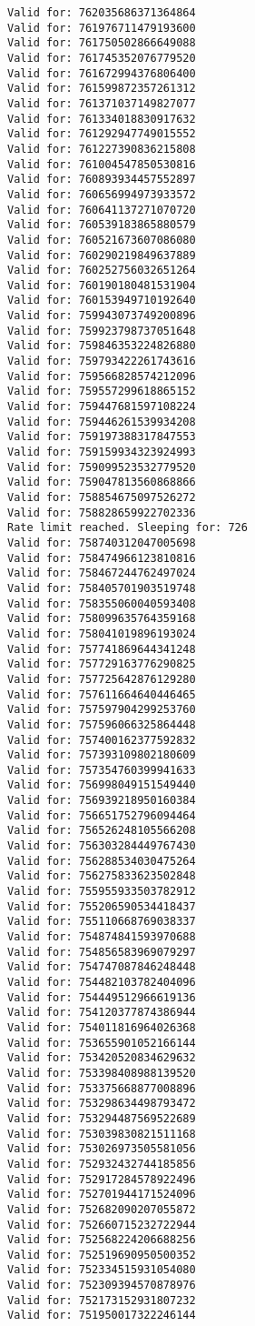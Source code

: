 \documentclass[11pt]{article}
\begin{document}
\begin{Verbatim}[commandchars=\\\{\}]
Valid for: 762035686371364864
Valid for: 761976711479193600
Valid for: 761750502866649088
Valid for: 761745352076779520
Valid for: 761672994376806400
Valid for: 761599872357261312
Valid for: 761371037149827077
Valid for: 761334018830917632
Valid for: 761292947749015552
Valid for: 761227390836215808
Valid for: 761004547850530816
Valid for: 760893934457552897
Valid for: 760656994973933572
Valid for: 760641137271070720
Valid for: 760539183865880579
Valid for: 760521673607086080
Valid for: 760290219849637889
Valid for: 760252756032651264
Valid for: 760190180481531904
Valid for: 760153949710192640
Valid for: 759943073749200896
Valid for: 759923798737051648
Valid for: 759846353224826880
Valid for: 759793422261743616
Valid for: 759566828574212096
Valid for: 759557299618865152
Valid for: 759447681597108224
Valid for: 759446261539934208
Valid for: 759197388317847553
Valid for: 759159934323924993
Valid for: 759099523532779520
Valid for: 759047813560868866
Valid for: 758854675097526272
Valid for: 758828659922702336
Rate limit reached. Sleeping for: 726
Valid for: 758740312047005698
Valid for: 758474966123810816
Valid for: 758467244762497024
Valid for: 758405701903519748
Valid for: 758355060040593408
Valid for: 758099635764359168
Valid for: 758041019896193024
Valid for: 757741869644341248
Valid for: 757729163776290825
Valid for: 757725642876129280
Valid for: 757611664640446465
Valid for: 757597904299253760
Valid for: 757596066325864448
Valid for: 757400162377592832
Valid for: 757393109802180609
Valid for: 757354760399941633
Valid for: 756998049151549440
Valid for: 756939218950160384
Valid for: 756651752796094464
Valid for: 756526248105566208
Valid for: 756303284449767430
Valid for: 756288534030475264
Valid for: 756275833623502848
Valid for: 755955933503782912
Valid for: 755206590534418437
Valid for: 755110668769038337
Valid for: 754874841593970688
Valid for: 754856583969079297
Valid for: 754747087846248448
Valid for: 754482103782404096
Valid for: 754449512966619136
Valid for: 754120377874386944
Valid for: 754011816964026368
Valid for: 753655901052166144
Valid for: 753420520834629632
Valid for: 753398408988139520
Valid for: 753375668877008896
Valid for: 753298634498793472
Valid for: 753294487569522689
Valid for: 753039830821511168
Valid for: 753026973505581056
Valid for: 752932432744185856
Valid for: 752917284578922496
Valid for: 752701944171524096
Valid for: 752682090207055872
Valid for: 752660715232722944
Valid for: 752568224206688256
Valid for: 752519690950500352
Valid for: 752334515931054080
Valid for: 752309394570878976
Valid for: 752173152931807232
Valid for: 751950017322246144

\end{Verbatim}
\end{document}
